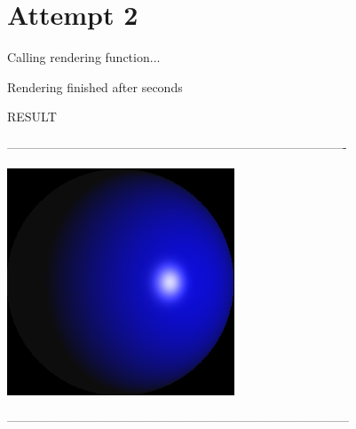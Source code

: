 \documentclass{scrartcl}
\begin{document}
\section*{Attempt 2}
{
\ttfamily


\RenderStat

Calling rendering function...
\def\timeA{}
\def\timeB{}
\GetTime\timeA
{}
\GetTime\timeB

Rendering finished after \GetDuration{\timeA}{\timeB} seconds


\begin{center}

    RESULT

    ----------------------------------------------------------------------------------

    \includegraphics[width=0.4\linewidth]{render2.png}

    -----------------------------------------------------------------------------------
\end{center}
}
\end{document}
